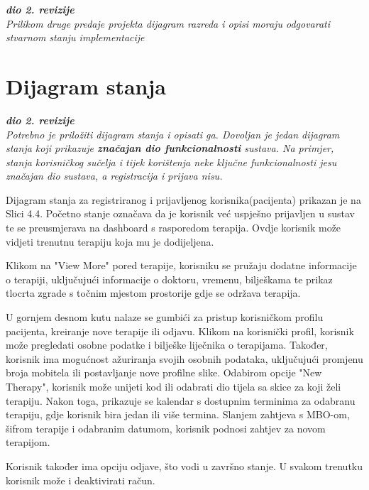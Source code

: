   

   
   \textbf{\textit{dio 2. revizije}}\\			
			
			\textit{Prilikom druge predaje projekta dijagram razreda i opisi moraju odgovarati stvarnom stanju implementacije}
			
			
			
			\eject
		
		\section{Dijagram stanja}
			
			
			\textbf{\textit{dio 2. revizije}}\\
			
			\textit{Potrebno je priložiti dijagram stanja i opisati ga. Dovoljan je jedan dijagram stanja koji prikazuje \textbf{značajan dio funkcionalnosti} sustava. Na primjer, stanja korisničkog sučelja i tijek korištenja neke ključne funkcionalnosti jesu značajan dio sustava, a registracija i prijava nisu. }

   Dijagram stanja za registriranog i prijavljenog korisnika(pacijenta) prikazan je na Slici 4.4. Početno stanje označava da je korisnik već uspješno prijavljen u sustav te se preusmjerava na dashboard s rasporedom terapija. Ovdje korisnik može vidjeti trenutnu terapiju koja mu je dodijeljena.

Klikom na "View More" pored terapije, korisniku se pružaju dodatne informacije o terapiji, uključujući informacije o doktoru, vremenu, bilješkama te prikaz tlocrta zgrade s točnim mjestom prostorije gdje se održava terapija.

U gornjem desnom kutu nalaze se gumbići za pristup korisničkom profilu pacijenta, kreiranje nove terapije ili odjavu. Klikom na korisnički profil, korisnik može pregledati osobne podatke i bilješke liječnika o terapijama. Također, korisnik ima mogućnost ažuriranja svojih osobnih podataka, uključujući promjenu broja mobitela ili postavljanje nove profilne slike. Odabirom opcije "New Therapy", korisnik može unijeti kod ili odabrati dio tijela sa skice za koji želi terapiju. Nakon toga, prikazuje se kalendar s dostupnim terminima za odabranu terapiju, gdje korisnik bira jedan ili više termina. Slanjem zahtjeva s MBO-om, šifrom terapije i odabranim datumom, korisnik podnosi zahtjev za novom terapijom.

Korisnik također ima opciju odjave, što vodi u završno stanje. U svakom trenutku korisnik može i deaktivirati račun.
			
